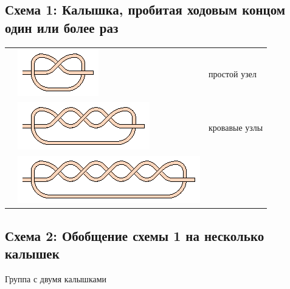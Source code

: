 \subsection{Схема 1: Калышка, пробитая ходовым концом один или более раз}

\graphicspath{{\currentpath}}


\begin{tabular}{
	>{\centering\arraybackslash}m{1cm}
	>{\centering\arraybackslash}m{8cm}
	>{\centering\arraybackslash}m{3cm}
}
1 & \includegraphics[scale=2]{images/simple-0.eps} & простой узел \\
2 & \includegraphics[scale=2]{images/simple-1.eps} & кровавые узлы \\
3 & \includegraphics[scale=2]{images/simple-2.eps} & 
\end{tabular}


\subsection{Схема 2: Обобщение схемы 1 на несколько калышек}

Группа с двумя калышками

